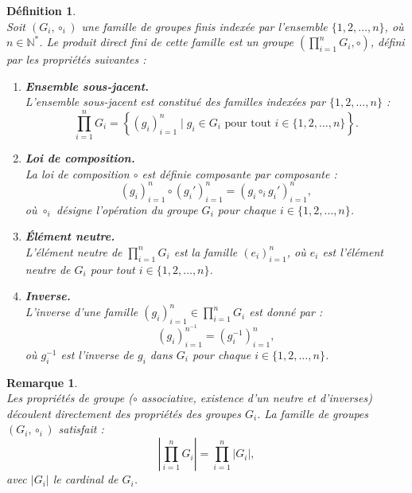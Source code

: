 \documentclass[a4paper, 14pt]{report}
\newtheorem{definition}{Définition}[section]
\newtheorem{remark}{Remarque}[section]
\begin{document}
\begin{onehalfspace}
{\begin{definition} \cite{schaub1997}\\
Soit \( (G_i, \circ_i) \) une famille de groupes finis indexée par l'ensemble \( \{1, 2, \dots, n\} \), où \( n \in \mathbb{N}^{*} \). Le \textit{produit direct fini} de cette famille est un groupe \( \left( \prod_{i=1}^{n} G_i, \circ \right) \), défini par les propriétés suivantes : 
	\begin{enumerate}[label=\roman*)]
		\item \textbf{Ensemble sous-jacent.} \\
L'ensemble sous-jacent est constitué des familles indexées par \( \{1, 2, \dots, n\} \) :  
		\[
		\prod_{i=1}^{n} G_i = \left\{ (g_i)_{i=1}^{n} \mid g_i \in G_i \text{ pour tout } i \in \{1, 2, \dots, n\} \right\}.
		\]
		\item \textbf{Loi de composition.} \\
		La loi de composition \( \circ \) est définie composante par composante :  
		\[
		(g_i)_{i=1}^{n} \circ (g_i')_{i=1}^{n} = (g_i \circ_i g_i')_{i=1}^{n},
		\]  
		où \( \circ_i \) désigne l'opération du groupe \( G_i \) pour chaque \( i \in \{1, 2, \dots, n\} \).
		\item \textbf{Élément neutre.} \\
L'élément neutre de \( \prod_{i=1}^{n} G_i \) est la famille \( (e_i)_{i=1}^{n} \), où \( e_i \) est l'élément neutre de \( G_i \) pour tout \( i \in \{1, 2, \dots, n\} \).
		\item \textbf{Inverse.} \\
L'inverse d'une famille \( (g_i)_{i=1}^{n} \in \prod_{i=1}^{n} G_i \) est donné par :  
		\[
		(g_i)_{i=1}^{{n}^{-1}} = (g_i^{-1})_{i=1}^{n},
		\]  
		où \( g_i^{-1} \) est l'inverse de \( g_i \) dans \( G_i \) pour chaque \( i \in \{1, 2, \dots, n\} \).\\
	\end{enumerate}
\end{definition}


\begin{remark} \cite{schaub1997} \\
Les propriétés de groupe (\( \circ \) associative, existence d’un neutre et d’inverses) découlent directement des propriétés des groupes \( G_i \).
La famille de groupes \( (G_i, \circ_i) \) satisfait :
\[
\left| \prod_{i=1}^{n} G_i \right| = \prod_{i=1}^{n} |G_i|,
\]
avec \( |G_i| \) le cardinal de \( G_i \).\\
\end{remark}

}
\end{onehalfspace}
\end{document}

